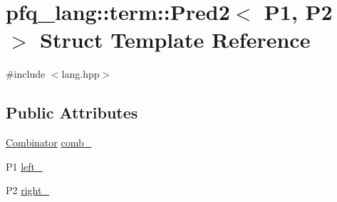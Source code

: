\hypertarget{structpfq__lang_1_1term_1_1Pred2}{\section{pfq\+\_\+lang\+:\+:term\+:\+:Pred2$<$ P1, P2 $>$ Struct Template Reference}
\label{structpfq__lang_1_1term_1_1Pred2}
}


{\ttfamily \#include $<$lang.\+hpp$>$}

\subsection*{Public Attributes}
\begin{DoxyCompactItemize}
\item 
\hyperlink{structpfq__lang_1_1term_1_1Combinator}{Combinator} \hyperlink{structpfq__lang_1_1term_1_1Pred2_a6b0db7f4e7c69fef8112e5b9a65e2af9}{comb\+\_\+}
\item 
P1 \hyperlink{structpfq__lang_1_1term_1_1Pred2_accc6c58f733abc7027ffde56148dd91e}{left\+\_\+}
\item 
P2 \hyperlink{structpfq__lang_1_1term_1_1Pred2_a0bc158e2c177545dcc9199caab6a4d12}{right\+\_\+}
\end{DoxyCompactItemize}


